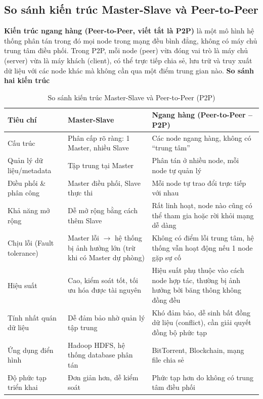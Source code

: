 \documentclass[../main.tex]{subfiles}
\begin{document}
\subsection{So sánh kiến trúc Master-Slave và Peer-to-Peer}
\textbf{Kiến trúc ngang hàng (Peer-to-Peer, viết tắt là P2P)} là một mô hình hệ thống phân tán trong đó mọi node trong mạng đều bình đẳng, không có máy chủ trung tâm điều phối. Trong P2P, mỗi node (peer) vừa đóng vai trò là máy chủ (server) vừa là máy khách (client), có thể trực tiếp chia sẻ, lưu trữ và truy xuất dữ liệu với các node khác mà không cần qua một điểm trung gian nào.
\textbf{So sánh hai kiến trúc}
\begin{table}[H]
    \centering
    \renewcommand{\arraystretch}{1.2}
    \begin{tabular}{|>{\raggedright\arraybackslash}p{4cm}|>{\raggedright\arraybackslash}p{5cm}|>{\raggedright\arraybackslash}p{5cm}|}
        \hline
        \textbf{Tiêu chí} & \textbf{Master-Slave} & \textbf{Ngang hàng (Peer-to-Peer – P2P)} \\
        \hline
        Cấu trúc & Phân cấp rõ ràng: 1 Master, nhiều Slave & Các node ngang hàng, không có “trung tâm” \\
        \hline
        Quản lý dữ liệu/metadata & Tập trung tại Master & Phân tán ở nhiều node, mỗi node tự quản lý \\
        \hline
        Điều phối \& phân công & Master điều phối, Slave thực thi & Mỗi node tự trao đổi trực tiếp với nhau \\
        \hline
        Khả năng mở rộng & Dễ mở rộng bằng cách thêm Slave & Rất linh hoạt, node nào cũng có thể tham gia hoặc rời khỏi mạng dễ dàng \\
        \hline
        Chịu lỗi (Fault tolerance) & Master lỗi $\rightarrow$ hệ thống bị ảnh hưởng lớn (trừ khi có Master dự phòng) & Không có điểm lỗi trung tâm, hệ thống vẫn hoạt động nếu 1 node gặp sự cố \\
        \hline
        Hiệu suất & Cao, kiểm soát tốt, tối ưu hóa được tài nguyên & Hiệu suất phụ thuộc vào cách node hợp tác, thường bị ảnh hưởng bởi băng thông không đồng đều \\
        \hline
        Tính nhất quán dữ liệu & Dễ đảm bảo nhờ quản lý tập trung & Khó đảm bảo, dễ sinh bất đồng dữ liệu (conflict), cần giải quyết đồng bộ phức tạp \\
        \hline
        Ứng dụng điển hình & Hadoop HDFS, hệ thống database phân tán & BitTorrent, Blockchain, mạng file chia sẻ \\
        \hline
        Độ phức tạp triển khai & Đơn giản hơn, dễ kiểm soát & Phức tạp hơn do không có trung tâm điều phối \\
        \hline
    \end{tabular}
    \caption{So sánh kiến trúc Master-Slave và Peer-to-Peer (P2P)}
    \label{tab:master_slave_vs_p2p}
\end{table}
\end{document}
